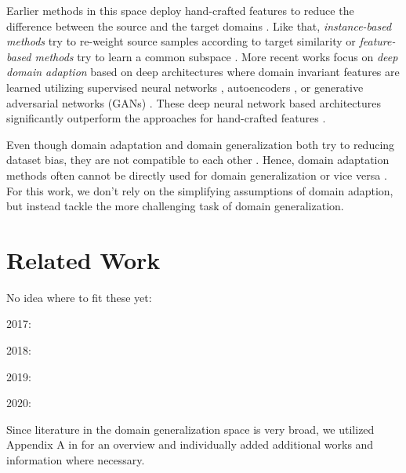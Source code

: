 Earlier methods in this space deploy hand-crafted features to reduce the difference between the source and the target domains \citep{ManciniPBC018}. Like that, \emph{instance-based methods} try to re-weight source samples according to target similarity \citep{GongGS13, HuangSGBS06, YamadaSR12} or \emph{feature-based methods} try to learn a common subspace \citep{FernandoHST13, GongSSG12, LongD0SGY13, BaktashmotlaghHLS13}. More recent works focus on \emph{deep domain adaption} based on deep architectures where domain invariant features are learned utilizing supervised neural networks \citep{BousmalisTSKE16, CarlucciPCRB17, GaninL15, GhifaryKZBL16}, autoencoders \citep{ZengOWW14}, or generative adversarial networks (GANs) \citep{BousmalisSDEK17, ShrivastavaPTSW17, TzengHSD17}. These deep neural network based architectures significantly outperform the approaches for hand-crafted features \citep{ManciniPBC018}.

Even though domain adaptation and domain generalization both try to reducing dataset bias, they are not compatible to each other \citep{GhifaryBKZ17}. Hence, domain adaptation methods often cannot be directly used for domain generalization or vice versa \citep{GhifaryBKZ17}. For this work, we don't rely on the simplifying assumptions of domain adaption, but instead tackle the more challenging task of domain generalization.

\section{Related Work}

No idea where to fit these yet: 

2017: 
\citep{LiYSH17}

2018: 
\citep{NiuLXC18}

2019: 
\citep{CarlucciDBCT19}
\citep{VolpiM19} 
\citep{yao2019adversarial}
\citep{arjovsky2019invariant}
\citep{seo2019learning}

2020: 
\citep{QiaoZP20}
\citep{bellot2020generalization}
\citep{jin2020feature}
\citep{somavarapu2020frustratingly}
\citep{deng2020representation}
\citep{mahajan2020domain}
\citep{wang2020learning}
\citep{du2020learning}
\citep{huang2020selfchallenging}
\citep{zhou2020learning}
\citep{Jia_2020_CVPR_SSDG}
\citep{piratla2020efficient}
\citep{RyuK0L20}






Since literature in the domain generalization space is very broad, we utilized Appendix A in \citet{gulrajani2020search} for an overview and individually added additional works and information where necessary.  

